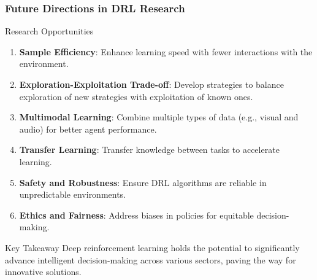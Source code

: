 \documentclass[aspectratio=169]{beamer}
\begin{document}
\begin{frame}[fragile]
    \frametitle{Future Directions in DRL Research}
    \begin{block}{Research Opportunities}
        \begin{enumerate}
            \item \textbf{Sample Efficiency}: Enhance learning speed with fewer interactions with the environment.
            \item \textbf{Exploration-Exploitation Trade-off}: Develop strategies to balance exploration of new strategies with exploitation of known ones.
            \item \textbf{Multimodal Learning}: Combine multiple types of data (e.g., visual and audio) for better agent performance.
            \item \textbf{Transfer Learning}: Transfer knowledge between tasks to accelerate learning.
            \item \textbf{Safety and Robustness}: Ensure DRL algorithms are reliable in unpredictable environments.
            \item \textbf{Ethics and Fairness}: Address biases in policies for equitable decision-making.
        \end{enumerate}
    \end{block}
    
    \begin{block}{Key Takeaway}
        Deep reinforcement learning holds the potential to significantly advance intelligent decision-making across various sectors, paving the way for innovative solutions.
    \end{block}
\end{frame}
\end{document}
